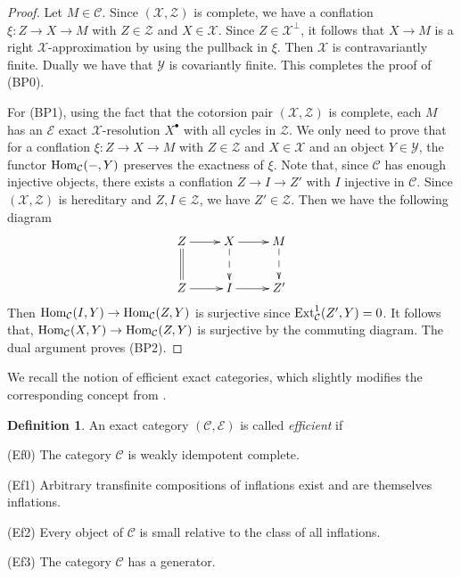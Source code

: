 \documentclass[reqno,12pt]{amsart}
\numberwithin{equation}{section}
\def\Ext{\mbox{\rm Ext}} \def\Tor{\mbox{\rm Tor}}\def\Hom{\mbox{\rm Hom}} \def\dim{\mbox{\rm dim}} \def\Iso{\mbox{\rm Iso}}
\def\dim{\mbox{\rm dim}}\def\Irr{\mbox{\rm Irr}}\def\rad{\mbox{\rm rad}}\def\fg{\mbox{\rm fg}}
\theoremstyle{plain}
\theoremstyle{definition}
\newtheorem{definition}[theorem]{\bf Definition}
\begin{document}
\begin{proof}
    Let $M\in\mathcal{C}$. Since $(\mathcal{X},\mathcal{Z})$ is complete, we have a conflation
    $\xi:Z\to X\to M$ with $Z\in\mathcal{Z}$ and $X\in\mathcal{X}$.
    Since $Z\in\mathcal{X}^{\bot}$,
    it follows that $X\to M$ is a right $\mathcal{X}$-approximation by using the pullback in
    $\xi$. Then $\mathcal{X}$ is contravariantly finite. Dually we have that
    $\mathcal{Y}$ is covariantly finite. This completes the proof of {\rm (BP0)}.

    For {\rm (BP1)}, using the fact that the cotorsion pair $(\mathcal{X},\mathcal{Z})$ is
    complete, each $M$ has an $\mathcal{E}$ exact $\mathcal{X}$-resolution $X^{\bullet}$ with
    all cycles in $\mathcal{Z}$. We only need to prove that for a conflation
    $\xi:Z\to X\to M$ with $Z\in\mathcal{Z}$ and $X\in\mathcal{X}$ and an object
    $Y\in\mathcal{Y}$, the functor $\Hom_{\mathcal{C}}(-,Y)$ preserves the exactness of $\xi$. Note that, since $\mathcal{C}$ has enough injective objects, there exists a conflation $Z\to I\to Z'$ with
    $I$ injective in $\mathcal{C}$. Since $(\mathcal{X},\mathcal{Z})$ is hereditary and
    $Z,I\in\mathcal{Z}$, we have $Z'\in\mathcal{Z}$.
    Then we have the following diagram $$\xymatrix{
        Z \ar@{=}[d] \ar[r] & X \ar@{-->}[d] \ar[r] & M \ar@{-->}[d]\\
        Z \ar[r] & I \ar[r] & Z'\\
    }$$ Then $\Hom_{\mathcal{C}}(I,Y)\to \Hom_{\mathcal{C}}(Z,Y)$ is surjective since
    $\Ext_{\mathcal{C}}^1(Z',Y)=0$. It follows that,
    $\Hom_{\mathcal{C}}(X,Y)\to \Hom_{\mathcal{C}}(Z,Y)$ is surjective by
    the commuting diagram. The dual argument proves {\rm (BP2)}.
\end{proof}

We recall the notion of efficient exact categories, which slightly modifies the corresponding concept from \cite[Definition 2.6]{SS11}.
\begin{definition}\cite[Definition 3.4]{S13}
    An exact category $(\mathcal{C},\mathcal{E})$ is called {\it efficient} if

    {\rm (Ef0)} The category $\mathcal{C}$ is weakly idempotent complete.

    {\rm (Ef1)} Arbitrary transfinite compositions of inflations exist and are themselves inflations.

    {\rm (Ef2)} Every object of $\mathcal{C}$ is small relative to the class of all inflations.

    {\rm (Ef3)} The category $\mathcal{C}$ has a generator.
\end{definition}
\end{document}
